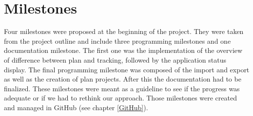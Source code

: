 \section{Milestones} \label{Milestones}
Four milestones were proposed at the beginning of the project. They were taken from the project outline and include three programming milestones and one documentation milestone. The first one was the implementation of the overview of difference between plan and tracking, followed by the application status display. The final programming milestone was composed of the import and export as well as the creation of plan projects. After this the documentation had to be finalized. These milestones were meant as a guideline to see if the progress was adequate or if we had to rethink our approach. Those milestones were created and managed in GitHub (see chapter \ref{GitHub}). 

